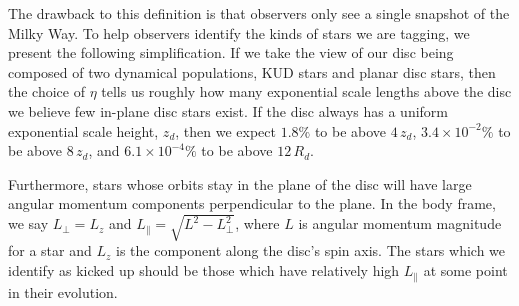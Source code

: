 
The drawback to this definition is that observers only see a single snapshot of the Milky Way. To help observers identify the kinds of stars we are tagging, we present the following simplification. If we take the view of our disc being composed of two dynamical populations, KUD stars and planar disc stars, then the choice of $\eta$ tells us roughly how many exponential scale lengths above the disc we believe few in-plane disc stars exist. If the disc always has a uniform exponential scale height, $z_d$, then we expect $1.8\%$ to be above $4\,z_d$, $3.4 \times 10^{-2}\%$ to be above $8\,z_d$, and $6.1 \times 10^{-4}\%$ to be above $12 \,R_d$.

Furthermore, stars whose orbits stay in the plane of the disc will have large angular momentum components perpendicular to the plane. In the body frame, we say $L_\perp=L_z$ and $L_\parallel = \sqrt{L^2 - L_\perp^2}$, where $L$ is angular momentum magnitude for a star and $L_z$ is the component along the disc's spin axis. The stars which we identify as kicked up should be those which have relatively high $L_\parallel$ at some point in their evolution. 

